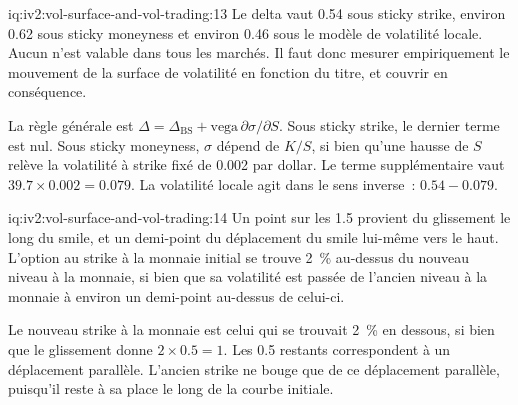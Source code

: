 \begin{solution}{iq:iv2:vol-surface-and-vol-trading:13}
Le delta vaut 0.54 sous sticky strike, environ 0.62 sous sticky moneyness et environ 0.46 sous le modèle de volatilité locale. Aucun n'est valable dans tous les marchés. Il faut donc mesurer empiriquement le mouvement de la surface de volatilité en fonction du titre, et couvrir en conséquence.

La règle générale est $\Delta = \Delta_{\text{BS}} + \text{vega}\,\partial\sigma/\partial S$. Sous sticky strike, le dernier terme est nul. Sous sticky moneyness, $\sigma$ dépend de $K/S$, si bien qu'une hausse de $S$ relève la volatilité à strike fixé de 0.002 par dollar. Le terme supplémentaire vaut $39.7 \times 0.002 = 0.079$. La volatilité locale agit dans le sens inverse~: $0.54 - 0.079$.

\end{solution}

\begin{solution}{iq:iv2:vol-surface-and-vol-trading:14}
Un point sur les 1.5 provient du glissement le long du smile, et un demi-point du déplacement du smile lui-même vers le haut. L'option au strike à la monnaie initial se trouve 2~\% au-dessus du nouveau niveau à la monnaie, si bien que sa volatilité est passée de l'ancien niveau à la monnaie à environ un demi-point au-dessus de celui-ci.

Le nouveau strike à la monnaie est celui qui se trouvait 2~\% en dessous, si bien que le glissement donne $2 \times 0.5 = 1$. Les 0.5 restants correspondent à un déplacement parallèle. L'ancien strike ne bouge que de ce déplacement parallèle, puisqu'il reste à sa place le long de la courbe initiale.

\end{solution}

